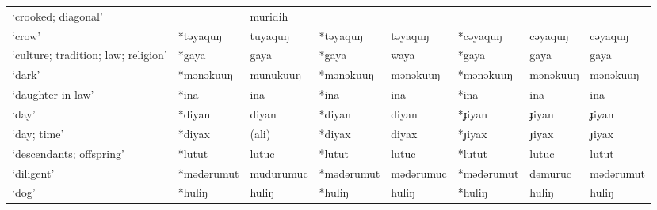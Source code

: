 \begin{landscape}
\begin{longtable}[c]{@{}p{3cm}<{\raggedright}p{2.75cm}<{\raggedright}p{2.75cm}<{\raggedright}p{2.75cm}<{\raggedright}p{2.75cm}<{\raggedright}p{2.75cm}<{\raggedright}p{2.75cm}<{\raggedright}p{2.75cm}<{\raggedright}@{}}
`crooked; diagonal'                                  &            & muridih                        &                    &                            &                  &                          &                                   \\
`crow'                                               & *təyaquŋ           & tuyaquŋ                        & *təyaquŋ           & təyaquŋ                    & *cəyaquŋ         & cəyaquŋ                  & cəyaquŋ                           \\
`culture; tradition; law; religion'                  & *gaya              & gaya                           & *gaya              & waya                       & *gaya            & gaya                     & gaya                              \\
`dark'                                               & *mənəkuuŋ          & munukuuŋ                       & *mənəkuuŋ          & mənəkuuŋ                   & *mənəkuuŋ        & mənəkuuŋ                 & mənəkuuŋ                          \\
`daughter-in-law'                                    & *ina               & ina                            & *ina               & ina                        & *ina             & ina                      & ina                               \\
`day'                                                & *diyan             & diyan                          & *diyan             & diyan                      & *ɟiyan           & ɟiyan                    & ɟiyan                             \\
`day; time'                                          & *diyax             & (ali)                            & *diyax             & diyax                      & *ɟiyax           & ɟiyax                    & ɟiyax                             \\
`descendants; offspring'                             & *lutut             & lutuc                          & *lutut             & lutuc                      & *lutut           & lutuc                    & lutut                             \\
`diligent'                                           & *mədərumut         & mudurumuc                      & *mədərumut         & mədərumuc                  & *mədərumut       & dəmuruc                  & mədərumut                         \\
`dog'                                                & *huliŋ             & huliŋ                          & *huliŋ             & huliŋ                      & *huliŋ           & huliŋ                    & huliŋ                             \\

\end{longtable}
\end{landscape}
